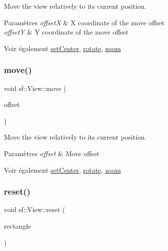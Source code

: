 Move the view relatively to its current position. 


\begin{DoxyParams}{Paramètres}
{\em offsetX} & X coordinate of the move offset \\
\hline
{\em offsetY} & Y coordinate of the move offset\\
\hline
\end{DoxyParams}
\begin{DoxySeeAlso}{Voir également}
\hyperlink{classsf_1_1View_aa8e3fedb008306ff9811163545fb75f2}{set\+Center}, \hyperlink{classsf_1_1View_a5fd3901aae1845586ca40add94faa378}{rotate}, \hyperlink{classsf_1_1View_a4a72a360a5792fbe4e99cd6feaf7726e}{zoom} 
\end{DoxySeeAlso}
\mbox{\label{classsf_1_1View_a4c98a6e04fed756dfaff8f629de50862}} 
\subsubsection{\texorpdfstring{move()}{move()}\hspace{0.1cm}{\footnotesize\ttfamily [2/2]}}
{\footnotesize\ttfamily void sf\+::\+View\+::move (\begin{DoxyParamCaption}\item[{const \hyperlink{classsf_1_1Vector2}{Vector2f} \&}]{offset }\end{DoxyParamCaption})}



Move the view relatively to its current position. 


\begin{DoxyParams}{Paramètres}
{\em offset} & Move offset\\
\hline
\end{DoxyParams}
\begin{DoxySeeAlso}{Voir également}
\hyperlink{classsf_1_1View_aa8e3fedb008306ff9811163545fb75f2}{set\+Center}, \hyperlink{classsf_1_1View_a5fd3901aae1845586ca40add94faa378}{rotate}, \hyperlink{classsf_1_1View_a4a72a360a5792fbe4e99cd6feaf7726e}{zoom} 
\end{DoxySeeAlso}
\mbox{\label{classsf_1_1View_ac95b636eafab3922b7e8304fb6c00d7d}} 
\subsubsection{\texorpdfstring{reset()}{reset()}}
{\footnotesize\ttfamily void sf\+::\+View\+::reset (\begin{DoxyParamCaption}\item[{const \hyperlink{classsf_1_1Rect}{Float\+Rect} \&}]{rectangle }\end{DoxyParamCaption})}




